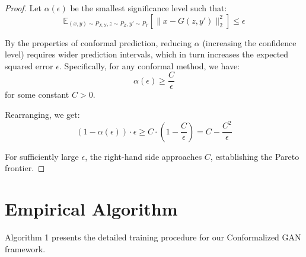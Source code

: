 \documentclass{article}
\theoremstyle{plain}
\theoremstyle{definition}
\theoremstyle{remark}
\begin{document}
\begin{proof}
Let $\alpha(\epsilon)$ be the smallest significance level such that:
\begin{equation}
\mathbb{E}_{(x,y) \sim P_{X,Y}, z \sim P_Z, y' \sim P_Y}\left[\|x - G(z, y')\|_2^2\right] \leq \epsilon
\end{equation}

By the properties of conformal prediction, reducing $\alpha$ (increasing the confidence level) requires wider prediction intervals, which in turn increases the expected squared error $\epsilon$. Specifically, for any conformal method, we have:
\begin{equation}
\alpha(\epsilon) \geq \frac{C}{\epsilon}
\end{equation}
for some constant $C > 0$.

Rearranging, we get:
\begin{equation}
(1-\alpha(\epsilon)) \cdot \epsilon \geq C \cdot (1 - \frac{C}{\epsilon}) = C - \frac{C^2}{\epsilon}
\end{equation}

For sufficiently large $\epsilon$, the right-hand side approaches $C$, establishing the Pareto frontier.
\end{proof}

\section{Empirical Algorithm}
Algorithm 1 presents the detailed training procedure for our Conformalized GAN framework.
\end{document}
